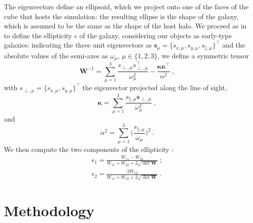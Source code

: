 \documentclass[a4paper,fleqn,usenatbib]{mnras}
\begin{document}
The eigenvectors define an ellipsoid, which we project onto one of the faces of the cube that hosts the simulation: the resulting ellipse is the shape of the galaxy, which is assumed to be the same as the shape of the host halo. We proceed as in \citet{Joachimietal2013a, Joachimietal2013b} to define the ellipticity $\epsilon$ of the galaxy, considering our objects as early-type galaxies: indicating the three unit eigenvectors as $\mathbf{s}_{\mu} = \big \{ s_{x, \mu}, s_{y, \mu}, s_{\mathbin{\|}, \mu}\big \}^\intercal$ and the absolute values of the semi-axes as $\omega_{\mu}$, $\mu \in \{1,2,3\}$, we define a symmetric tensor
\begin{equation}
    \mathbf{W}^{-1} = \sum _{\mu=1}^{3} \frac{s_{\perp, \mu} s^\intercal_{\perp, \mu}}{\omega_{\mu}^2} - \frac{\mathbf{\kappa}\mathbf{\kappa}^{\intercal}}{\alpha^2} \ ,
	\label{eq:symtensor}
\end{equation}
with $s_{\perp, \mu} = \big \{ s_{x, \mu}, s_{y, \mu}\big \}^\intercal$ the eigenvector projected along the line of sight, 
\begin{equation}
   \mathbf{\kappa} = \sum_{\mu = 1}^{3} \frac{s_{\mathbin{\|}, \mu} \mathbf{s}_{\perp, \mu}}{\omega_{\mu}^2} \ ,
	\label{eq:kappa}
\end{equation}
and 
\begin{equation}
    \alpha^2=\sum_{\mu = 1}^{3} \bigg( \frac{s_{\mathbin{\|}, \mu}}{\omega_{\mu}} \bigg)^2 \ .
	\label{eq:alpha}
\end{equation}
We then compute the two components of the ellipticity \citep{BartelmannSchneider2001}:
\begin{align}
    	\epsilon_{1} = \frac{W_{11} - W_{22}}{W_{11} + W_{22}+2\sqrt{\det \mathbf{W}}}\ ; \\ 
           \epsilon_{2} = \frac{2 W_{12}}{W_{11} + W_{22}+2\sqrt{\det \mathbf{W}}} \ .
\end{align}

\section{Methodology}
\label{sec:method}
\end{document}
